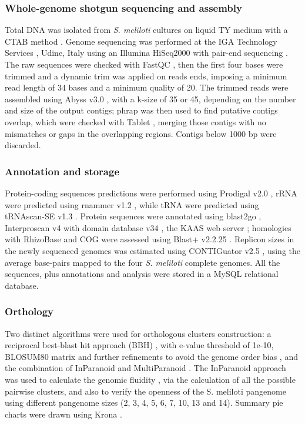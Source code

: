 \begin{small}
\subsubsection{Whole-genome shotgun sequencing and assembly}
Total DNA was isolated from \textit{S. meliloti} cultures on liquid TY medium \cite{beringer1974r} with a CTAB method \cite{galardini2011exploring}. Genome sequencing was performed at the IGA Technology Services \cite{iga}, Udine, Italy using an Illumina HiSeq2000 with pair-end sequencing \cite{bennett2004solexa}. The raw sequences were checked with FastQC \cite{fastqc}, then the first four bases were trimmed and a dynamic trim was applied on reads ends, imposing a minimum read length of 34 bases and a minimum quality of 20. The trimmed reads were assembled using Abyss v3.0 \cite{simpson2009abyss}, with a k-size of  35 or 45, depending on the number and size of the output contigs; phrap \cite{bastide2007assembling} was then used to find putative contigs overlap, which were checked with Tablet \cite{milne2010tablet}, merging those contigs with no mismatches or gaps in the overlapping regions. Contigs below 1000 bp were discarded.

\subsubsection{Annotation and storage}
Protein-coding sequences predictions were performed using Prodigal v2.0 \cite{hyatt2010prodigal}, rRNA were predicted using rnammer v1.2 \cite{lagesen2007rnammer}, while tRNA were predicted using tRNAscan-SE v1.3 \cite{lowe1997trnascan}. Protein sequences were annotated using blast2go \cite{conesa2005blast2go}, Interproscan v4 with domain database v34 \cite{zdobnov2001interproscan}, the KAAS web server \cite{moriya2007kaas}; homologies with RhizoBase \cite{rhizobase} and COG \cite{tatusov2003cog} were assessed using Blast+ v2.2.25 \cite{camacho2009blast+}. Replicon sizes in the newly sequenced genomes was estimated using CONTIGuator v2.5 \cite{galardini2011contiguator}, using the average base-pairs mapped to the four \textit{S. meliloti} complete genomes. All the sequences, plus annotations and analysis were stored in a MySQL relational database.

\subsubsection{Orthology}
Two distinct algorithms were used for orthologous clusters construction: a reciprocal best-blast hit approach (BBH) \cite{altenhoff2009phylogenetic}, with e-value threshold of 1e-10, BLOSUM80 matrix and further refinements to avoid the genome order bias \cite{popa2011directed}, and the combination of InParanoid \cite{remm2001automatic} and MultiParanoid \cite{alexeyenko2006automatic}. The InParanoid approach was used to calculate the genomic fluidity \cite{kislyuk2011genomic}, via the calculation of all the possible pairwise clusters, and also to verify the openness of the S. meliloti pangenome using different pangenome sizes (2, 3, 4, 5, 6, 7, 10, 13 and 14). Summary pie charts were drawn using Krona \cite{brian12interactive}.


\end{small}
